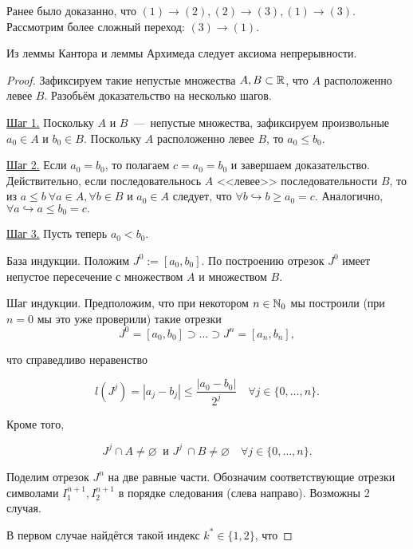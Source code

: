     \begin{note}
        Ранее было доказанно, что $(1) \rightarrow (2), (2) \rightarrow (3), (1) \rightarrow (3).$ Рассмотрим более сложный переход: $(3) \rightarrow (1).$
    \end{note}
    \begin{theorem}
        Из леммы Кантора и леммы Архимеда следует аксиома непрерывности.
    \end{theorem}
    \begin{proof}
        Зафиксируем такие непустые множества $A, B \subset \mathbb{R}$, что $A$ расположенно левее $B.$ Разобьём доказательство на несколько шагов.
        
        \underline{Шаг 1.} Поскольку $A$ и $B$~---~непустые множества, зафиксируем произвольные $a_{0} \in A$ и $b_{0} \in B.$ Поскольку $A$ расположенно левее $B$, то $a_{0} \leq b_{0}.$

        \underline{Шаг 2.} Если $a_{0} = b_{0}$, то полагаем $c = a_{0} = b_{0}$ и завершаем доказательство. Действительно, если последовательнось $A$ <<левее>> последовательности $B$, то из $a \leq b \  \forall a \in A, \forall b \in B$ и $a_{0} \in A$ следует, что $\forall b \hookrightarrow b \geq a_{0} = c.$ Аналогично, $\forall a \hookrightarrow a \leq b_{0} = c.$

        \underline{Шаг 3.} Пусть теперь $a_{0} < b_{0}.$

        База индукции. Положим $J^0 := [a_0, b_0]$. По построению отрезок $J^0$ имеет непустое пересечение с множеством $A$ и множеством $B$.
        
        Шаг индукции. Предположим, что при некотором $n \in \mathbb{N}_{0}$ мы построили (при $n = 0$ мы это уже проверили) такие отрезки
        $$ J^{0} = [a_{0}, b_{0}] \supset \ldots \supset J^{n} = [a_{n}, b_{n}],$$

        что справедливо неравенство

        $$\displaystyle l(J^{j}) = |a_{j} - b_{j}| \leq \frac{|a_{0} - b_{0}|}{2^{j}} \quad \forall j \in \{ 0, \ldots, n \}.$$

        Кроме того,

        $$ J^{j} \cap A \neq \varnothing \  \text{ и  } J^{j} \    \cap B \neq \varnothing \quad \forall j \in \{ 0, \dots, n \}.$$

        Поделим отрезок $J^{n}$ на две равные части. Обозначим соответствующие отрезки символами $I^{n+1}_{1}, I^{n+1}_{2}$ в порядке следования (слева направо). Возможны 2 случая.

        В первом случае найдётся такой индекс $k^{*} \in \{ 1, 2\}$, что


\end{proof}
